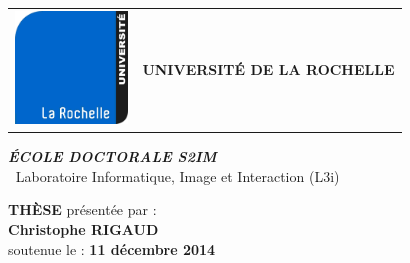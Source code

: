\thispagestyle{empty}

\setmarginsrb{20mm}{0mm}{15mm}{15mm}{0mm}{0mm}{0mm}{0mm}


\begin{tabular}{ p{3cm} p{12cm}}
		\begin{minipage}{3cm}
			\includegraphics[width=3cm]{./images/UnivLaRochelle.png} 
		\end{minipage}
	&
		\begin{minipage}{12cm}
			\begin{center}
				\textbf{\LARGE\textbf{UNIVERSIT\'{E} DE LA ROCHELLE}}
			\end{center}
		\end{minipage}
\end{tabular}
	
\vspace{1.3cm}
	
\begin{minipage}{16cm}
	\begin{center}
	\LARGE \textit{\textbf{
		\'ECOLE DOCTORALE S2IM \\ \vspace{0.2cm}}}
		$\ $ Laboratoire Informatique, Image et Interaction (L3i)
	\end{center}
\end{minipage}
	
\vspace{1.3cm}
	
\begin{minipage}{16cm}
	\begin{center}
		\LARGE \textbf{TH\`ESE}
		\normalsize pr\'esent\'ee par : \\ \vspace{0.5cm}
		\LARGE \textbf{Christophe RIGAUD}\\ \vspace{0.5cm}
		\large soutenue le : \textbf{11 d{\'e}cembre 2014}
	\end{center}
\end{minipage}
	
\vspace{0.2cm}
	

